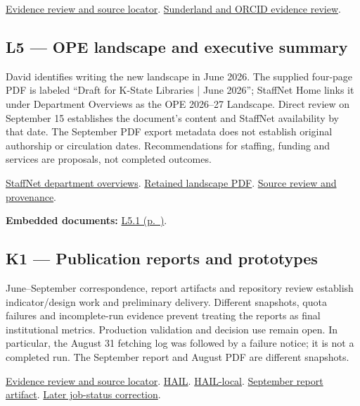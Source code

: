 \href{https://github.com/molikd/Molik-Tenure-Document/issues/4#issuecomment-5683752795}{Evidence review and source locator}.
\href{https://github.com/molikd/Molik-Tenure-Document/issues/4#issuecomment-5683209268}{Sunderland and ORCID evidence review}.

\hypertarget{evidence-L5}{}
\subsection{L5 --- OPE landscape and executive summary}
David identifies writing the new landscape in June 2026. The supplied four-page PDF is labeled ``Draft for K-State Libraries | June 2026''; StaffNet Home links it under Department Overviews as the OPE 2026--27 Landscape. Direct review on September 15 establishes the document's content and StaffNet availability by that date. The September PDF export metadata does not establish original authorship or circulation dates. Recommendations for staffing, funding and services are proposals, not completed outcomes.

\href{https://staffnet.atlassian.net/wiki/spaces/IN/overview}{StaffNet department overviews}.
\href{https://github.com/molikd/Molik-Tenure-Document/blob/codex/staffnet-landscape-evidence/evidence/2026/ope-landscape-june-2026.pdf}{Retained landscape PDF}.
\href{https://github.com/molikd/Molik-Tenure-Document/blob/codex/staffnet-landscape-evidence/planning/2026-staffnet-ticket-evidence.md}{Source review and provenance}.

\par\medskip\noindent\textbf{Embedded documents:} \hyperref[supplement-L5.1]{L5.1 (p.~\pageref{supplement-L5.1})}.

\hypertarget{evidence-K1}{}
\subsection{K1 --- Publication reports and prototypes}
June--September correspondence, report artifacts and repository review establish indicator/design work and preliminary delivery. Different snapshots, quota failures and incomplete-run evidence prevent treating the reports as final institutional metrics. Production validation and decision use remain open. In particular, the August 31 fetching log was followed by a failure notice; it is not a completed run. The September report and August PDF are different snapshots.

\href{https://github.com/molikd/Molik-Tenure-Document/issues/4#issuecomment-5683209268}{Evidence review and source locator}.
\href{https://github.com/molikd/hail}{HAIL}.
\href{https://github.com/molikd/hail-local}{HAIL-local}.
\href{https://github.com/user-attachments/files/32247185/kpi_report.md}{September report artifact}.
\href{https://github.com/molikd/Molik-Tenure-Document/issues/4#issuecomment-5683515539}{Later job-status correction}.

